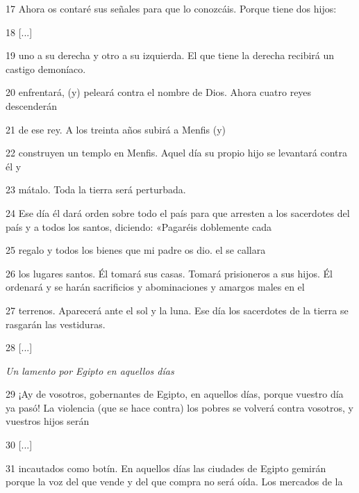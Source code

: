 \par 17 Ahora os contaré sus señales para que lo conozcáis. Porque tiene dos hijos:

\par 18 [...]

\par 19 uno a su derecha y otro a su izquierda. El que tiene la derecha recibirá un castigo demoníaco.

\par 20 enfrentará, (y) peleará contra el nombre de Dios. Ahora cuatro reyes descenderán

\par 21 de ese rey. A los treinta años subirá a Menfis (y)

\par 22 construyen un templo en Menfis. Aquel día su propio hijo se levantará contra él y

\par 23 mátalo. Toda la tierra será perturbada.

\par 24 Ese día él dará orden sobre todo el país para que arresten a los sacerdotes del país y a todos los santos, diciendo: «Pagaréis doblemente cada

\par 25 regalo y todos los bienes que mi padre os dio. el se callara

\par 26 los lugares santos. Él tomará sus casas. Tomará prisioneros a sus hijos. Él ordenará y se harán sacrificios y abominaciones y amargos males en el

\par 27 terrenos. Aparecerá ante el sol y la luna. Ese día los sacerdotes de la tierra se rasgarán las vestiduras.

\par 28 [...]

\par \textit{Un lamento por Egipto en aquellos días}

\par 29 ¡Ay de vosotros, gobernantes de Egipto, en aquellos días, porque vuestro día ya pasó! La violencia (que se hace contra) los pobres se volverá contra vosotros, y vuestros hijos serán

\par 30 [...]

\par 31 incautados como botín. En aquellos días las ciudades de Egipto gemirán porque la voz del que vende y del que compra no será oída. Los mercados de la

